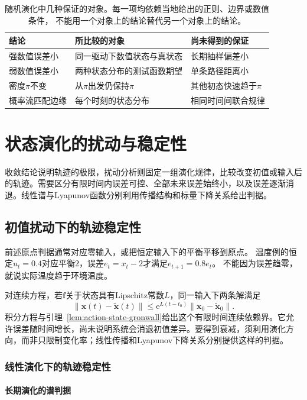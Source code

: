 \begin{table}[htbp]
 \centering
 \begin{tabularx}{\linewidth}{lXX}
 \toprule
 结论 & 所比较的对象 & 尚未得到的保证\\
 \midrule
 强数值误差小 & 同一驱动下数值状态与真状态 & 长期抽样偏差小\\
 弱数值误差小 & 两种状态分布的测试函数期望 & 单条路径距离小\\
 密度$\pi$不变 & 从$\pi$出发仍保持$\pi$ & 其他初态快速趋于$\pi$\\
 概率流匹配边缘 & 每个时刻的状态分布 & 相同时间间联合规律\\
 \bottomrule
 \end{tabularx}
 \caption{随机演化中几种保证的对象。每一项均依赖当地给出的正则、边界或数值条件，
 不能用一个对象上的结论替代另一个对象上的结论。}
 \label{tab:dynamical-path-distribution}
\end{table}

\section{状态演化的扰动与稳定性}
\label{sec:dynamical-stability-sensitivity}
收敛结论说明轨迹的极限，扰动分析则固定一组演化规律，比较改变初值或输入后的轨迹。需要区分有限时间内误差可控、全部未来误差始终小，以及误差逐渐消退。线性谱与Lyapunov函数分别利用传播结构和标量下降关系给出判据。

\subsection{初值扰动下的轨迹稳定性}
前述原点判据通常对应零输入，或把恒定输入下的平衡平移到原点。
温度例的恒定$u_t=0.4$对应平衡$2$，误差$e_t=x_t-2$才满足$e_{t+1}=0.8e_t$。
不能因为误差趋零，就说实际温度趋于环境温度。

对连续方程，若$\bm f$关于状态具有Lipschitz常数$L$，同一输入下两条解满足
\[
  \|\bm x(t)-\widetilde{\bm x}(t)\|
  \leq \mathrm e^{L(t-t_0)}\|\bm x_0-\widetilde{\bm x}_0\|.
\]
积分方程与引理~\ref{lem:action-state-gronwall}给出这个有限时间连续依赖界。它允许误差随时间增长，尚未说明系统会消退初值差异。要得到衰减，须利用演化方向，而非只限制变化率；线性传播和Lyapunov下降关系分别提供这样的判据。

\subsubsection{线性演化下的轨迹稳定性}
\paragraph{长期演化的谱判据}

